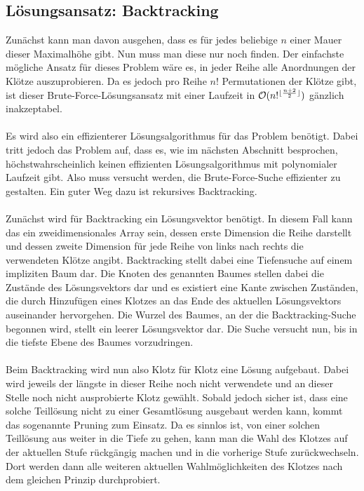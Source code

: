 \documentclass[a4paper, notitlepage, 12pt]{scrartcl}
\DeclarePairedDelimiter\floor{\lfloor}{\rfloor}
\begin{document}
\subsection{Lösungsansatz: Backtracking}
Zunächst kann man davon ausgehen, dass es für jedes beliebige $n$ einer Mauer dieser Maximalhöhe gibt. Nun muss man diese nur noch finden. Der einfachste mögliche Ansatz für dieses Problem wäre es, in jeder Reihe alle Anordnungen der Klötze auszuprobieren. Da es jedoch pro Reihe $n!$ Permutationen der Klötze gibt, ist dieser Brute-Force-Lösungsansatz mit einer Laufzeit in $\mathcal{O}(n!^{\floor{\frac{n + 2}{2}}})$ gänzlich inakzeptabel.
\\ \\
Es wird also ein effizienterer Lösungsalgorithmus für das Problem benötigt. Dabei tritt jedoch das Problem auf, dass es, wie im nächsten Abschnitt besprochen, höchstwahrscheinlich keinen effizienten Lösungsalgorithmus mit polynomialer Laufzeit gibt. Also muss versucht werden, die Brute-Force-Suche effizienter zu gestalten. Ein guter Weg dazu ist rekursives Backtracking.
\\ \\
Zunächst wird für Backtracking ein Lösungsvektor benötigt. In diesem Fall kann das ein zweidimensionales Array sein, dessen erste Dimension die Reihe darstellt und dessen zweite Dimension für jede Reihe von links nach rechts die verwendeten Klötze angibt. Backtracking stellt dabei eine Tiefensuche auf einem impliziten Baum dar. Die Knoten des genannten Baumes stellen dabei die Zustände des Lösungsvektors dar und es existiert eine Kante zwischen Zuständen, die durch Hinzufügen eines Klotzes an das Ende des aktuellen Lösungsvektors auseinander hervorgehen. Die Wurzel des Baumes, an der die Backtracking-Suche begonnen wird, stellt ein leerer Lösungsvektor dar. Die Suche versucht nun, bis in die tiefste Ebene des Baumes vorzudringen.
\\ \\
Beim Backtracking wird nun also Klotz für Klotz eine Lösung aufgebaut. Dabei wird jeweils der längste in dieser Reihe noch nicht verwendete und an dieser Stelle noch nicht ausprobierte Klotz gewählt. Sobald jedoch sicher ist, dass eine solche Teillösung nicht zu einer Gesamtlösung ausgebaut werden kann, kommt das sogenannte Pruning zum Einsatz. Da es sinnlos ist, von einer solchen Teillösung aus weiter in die Tiefe zu gehen, kann man die Wahl des Klotzes auf der aktuellen Stufe rückgängig machen und in die vorherige Stufe zurückwechseln. Dort werden dann alle weiteren aktuellen Wahlmöglichkeiten des Klotzes nach dem gleichen Prinzip durchprobiert.
\end{document}

